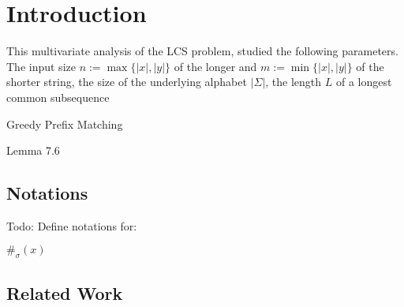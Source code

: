 \section{Introduction}

This multivariate analysis of the LCS problem, studied the following parameters.
The input size $n := \max\{|x|, |y|\}$ of the longer and $m := \min\{|x|, |y|\}$ of the shorter string, the size of the underlying alphabet $|\Sigma|$, the length $L$ of a longest common subsequence



Greedy Prefix Matching


Lemma 7.6


\subsection{Notations}
Todo: Define notations for:

$\#_\sigma(x)$


\subsection{Related Work}

